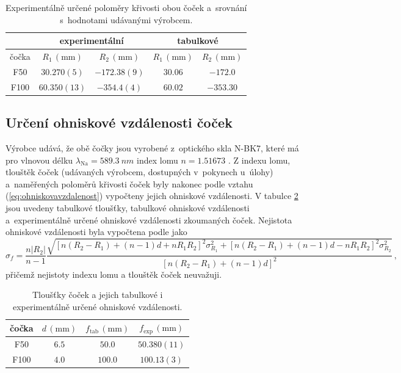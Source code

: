 \documentclass{../concepts/titul_protokol_p/prepareprotokol} %
\begin{document}
\begin{table}[!htbp]
    \centering
    \caption{Experimentálně určené poloměry křivosti obou čoček a~srovnání s~hodnotami udávanými výrobcem.}
    \begin{tabular}{c|cc|cc}
        \toprule
         & \multicolumn{2}{c|}{experimentální} & \multicolumn{2}{c}{tabulkové} \\
        \midrule
        čočka & $R_{1} \, (\mathrm{mm})$ & $R_{2} \, (\mathrm{mm})$ & 
        $R_{1} \, (\mathrm{mm})$ & $R_{2} \, (\mathrm{mm})$ \\
        \midrule
        F50 & $30.270(5)$ & $-172.38(9)$ & $30.06$ & $-172.0$ \\
        F100 & $60.350(13)$ & $-354.4(4)$ & $60.02$ & $-353.30$ \\
        \bottomrule
    \end{tabular}
    \label{tab:polomery}
\end{table}

\subsection{Určení ohniskové vzdálenosti čoček}

Výrobce udává, že obě čočky jsou vyrobené z~optického skla N-BK7, které má pro vlnovou délku 
$\lambda_\mathrm{Na} = \qty{589.3}{nm}$ \cite{vlnovedelky} index lomu $n = 1.51673$ \cite{schott}.
Z indexu lomu, tlouštěk čoček (udávaných výrobcem, dostupných v~pokynech u~úlohy) a~naměřených poloměrů 
křivosti čoček byly nakonec podle vztahu (\ref{eq:ohniskovavzdalenost})
vypočteny jejich ohniskové vzdálenosti. V tabulce \ref{tab:cockyvysledky} jsou uvedeny tabulkové tloušťky,
tabulkové ohniskové vzdálenosti a~experimentálně určené ohniskové vzdálenosti zkoumaných čoček. Nejistota
ohniskové vzdálenosti byla vypočtena podle \cite{englich} jako
\begin{equation}
    \label{eq:sigmaf}
    \sigma_f = \frac{n |R_2|}{n-1} \frac{\sqrt{\left[ n (R_2 - R_1) + (n-1) d + n R_1 R_2 \right]^2 \sigma_{R_1}^2 +
    \left[ n (R_2 - R_1) + (n-1) d - n R_1 R_2 \right]^2 \sigma_{R_2}^2 }}
    {\left[ n (R_2 - R_1) + (n-1) d \right]^2} \,,
\end{equation}
přičemž nejistoty indexu lomu a tlouštěk čoček neuvažuji.


\begin{table}[!htbp]
    \centering
    \caption{Tloušťky čoček a jejich tabulkové i experimentálně určené ohniskové vzdálenosti.}
    \begin{tabular}{cccc}
        \toprule
        čočka & $d \, (\mathrm{mm})$ & $f_\mathrm{tab} \, (\mathrm{mm})$ & $f_\mathrm{exp} \, (\mathrm{mm})$ \\
        \midrule
        F50 & $6.5$ & $50.0$ & $50.380(11)$ \\
        F100 & $4.0$ & $100.0$ & $100.13(3)$ \\
        \bottomrule
    \end{tabular}
    \label{tab:cockyvysledky}
\end{table}
\end{document}

